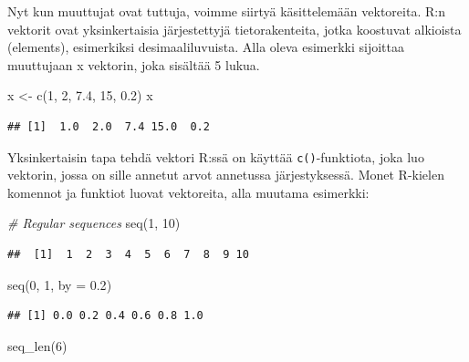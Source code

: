 \documentclass[
]{book}
\newenvironment{Shaded}{\begin{snugshade}}{\end{snugshade}}
\newcommand{\AttributeTok}[1]{\textcolor[rgb]{0.77,0.63,0.00}{#1}}
\newcommand{\CommentTok}[1]{\textcolor[rgb]{0.56,0.35,0.01}{\textit{#1}}}
\newcommand{\DecValTok}[1]{\textcolor[rgb]{0.00,0.00,0.81}{#1}}
\newcommand{\FloatTok}[1]{\textcolor[rgb]{0.00,0.00,0.81}{#1}}
\newcommand{\FunctionTok}[1]{\textcolor[rgb]{0.00,0.00,0.00}{#1}}
\newcommand{\NormalTok}[1]{#1}
\newcommand{\OtherTok}[1]{\textcolor[rgb]{0.56,0.35,0.01}{#1}}
\begin{document}
Nyt kun muuttujat ovat tuttuja, voimme siirtyä käsittelemään vektoreita. R:n vektorit ovat yksinkertaisia järjestettyjä tietorakenteita, jotka koostuvat alkioista (elements), esimerkiksi desimaaliluvuista. Alla oleva esimerkki sijoittaa muuttujaan x vektorin, joka sisältää 5 lukua.

\begin{Shaded}
\begin{Highlighting}[]
\NormalTok{x }\OtherTok{\textless{}{-}} \FunctionTok{c}\NormalTok{(}\DecValTok{1}\NormalTok{, }\DecValTok{2}\NormalTok{, }\FloatTok{7.4}\NormalTok{, }\DecValTok{15}\NormalTok{, }\FloatTok{0.2}\NormalTok{)}
\NormalTok{x}
\end{Highlighting}
\end{Shaded}

\begin{verbatim}
## [1]  1.0  2.0  7.4 15.0  0.2
\end{verbatim}

Yksinkertaisin tapa tehdä vektori R:ssä on käyttää \texttt{c()}-funktiota, joka luo vektorin, jossa on sille annetut arvot annetussa järjestyksessä. Monet R-kielen komennot ja funktiot luovat vektoreita, alla muutama esimerkki:

\begin{Shaded}
\begin{Highlighting}[]
\CommentTok{\# Regular sequences}
\FunctionTok{seq}\NormalTok{(}\DecValTok{1}\NormalTok{, }\DecValTok{10}\NormalTok{)}
\end{Highlighting}
\end{Shaded}

\begin{verbatim}
##  [1]  1  2  3  4  5  6  7  8  9 10
\end{verbatim}

\begin{Shaded}
\begin{Highlighting}[]
\FunctionTok{seq}\NormalTok{(}\DecValTok{0}\NormalTok{, }\DecValTok{1}\NormalTok{, }\AttributeTok{by =} \FloatTok{0.2}\NormalTok{)}
\end{Highlighting}
\end{Shaded}

\begin{verbatim}
## [1] 0.0 0.2 0.4 0.6 0.8 1.0
\end{verbatim}

\begin{Shaded}
\begin{Highlighting}[]
\FunctionTok{seq\_len}\NormalTok{(}\DecValTok{6}\NormalTok{)}
\end{Highlighting}
\end{Shaded}
\end{document}
